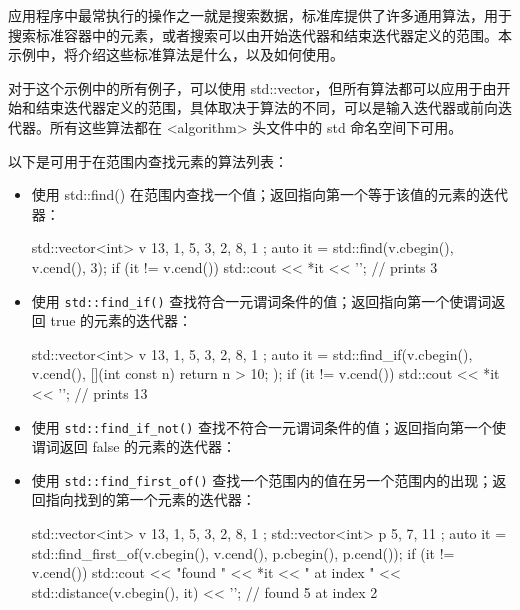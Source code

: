 应用程序中最常执行的操作之一就是搜索数据，标准库提供了许多通用算法，用于搜索标准容器中的元素，或者搜索可以由开始迭代器和结束迭代器定义的范围。本示例中，将介绍这些标准算法是什么，以及如何使用。


对于这个示例中的所有例子，可以使用 std::vector，但所有算法都可以应用于由开始和结束迭代器定义的范围，具体取决于算法的不同，可以是输入迭代器或前向迭代器。所有这些算法都在 <algorithm> 头文件中的 std 命名空间下可用。


以下是可用于在范围内查找元素的算法列表：

\begin{itemize}
\item
使用 std::find() 在范围内查找一个值；返回指向第一个等于该值的元素的迭代器：

\begin{cpp}
std::vector<int> v{ 13, 1, 5, 3, 2, 8, 1 };
auto it = std::find(v.cbegin(), v.cend(), 3);
if (it != v.cend()) std::cout << *it << '\n'; // prints 3
\end{cpp}

\item
使用 \verb|std::find_if()| 查找符合一元谓词条件的值；返回指向第一个使谓词返回 true 的元素的迭代器：

\begin{cpp}
std::vector<int> v{ 13, 1, 5, 3, 2, 8, 1 };
auto it = std::find_if(v.cbegin(), v.cend(),
                       [](int const n) {return n > 10; });
if (it != v.cend()) std::cout << *it << '\n'; // prints 13
\end{cpp}

\item
使用 \verb|std::find_if_not()| 查找不符合一元谓词条件的值；返回指向第一个使谓词返回 false 的元素的迭代器：


\item
使用 \verb|std::find_first_of()| 查找一个范围内的值在另一个范围内的出现；返回指向找到的第一个元素的迭代器：

\begin{cpp}
std::vector<int> v{ 13, 1, 5, 3, 2, 8, 1 };
std::vector<int> p{ 5, 7, 11 };
auto it = std::find_first_of(v.cbegin(), v.cend(),
                             p.cbegin(), p.cend());
if (it != v.cend())
    std::cout << "found " << *it
              << " at index " << std::distance(v.cbegin(), it)
              << '\n';
// found 5 at index 2
\end{cpp}


\end{itemize}
